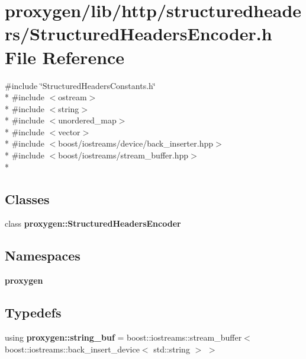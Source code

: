 \section{proxygen/lib/http/structuredheaders/\+Structured\+Headers\+Encoder.h File Reference}
\label{StructuredHeadersEncoder_8h}
{\ttfamily \#include \char`\"{}Structured\+Headers\+Constants.\+h\char`\"{}}\\*
{\ttfamily \#include $<$ostream$>$}\\*
{\ttfamily \#include $<$string$>$}\\*
{\ttfamily \#include $<$unordered\+\_\+map$>$}\\*
{\ttfamily \#include $<$vector$>$}\\*
{\ttfamily \#include $<$boost/iostreams/device/back\+\_\+inserter.\+hpp$>$}\\*
{\ttfamily \#include $<$boost/iostreams/stream\+\_\+buffer.\+hpp$>$}\\*
\subsection*{Classes}
\begin{DoxyCompactItemize}
\item 
class {\bf proxygen\+::\+Structured\+Headers\+Encoder}
\end{DoxyCompactItemize}
\subsection*{Namespaces}
\begin{DoxyCompactItemize}
\item 
 {\bf proxygen}
\end{DoxyCompactItemize}
\subsection*{Typedefs}
\begin{DoxyCompactItemize}
\item 
using {\bf proxygen\+::string\+\_\+buf} = boost\+::iostreams\+::stream\+\_\+buffer$<$ boost\+::iostreams\+::back\+\_\+insert\+\_\+device$<$ std\+::string $>$ $>$
\end{DoxyCompactItemize}
